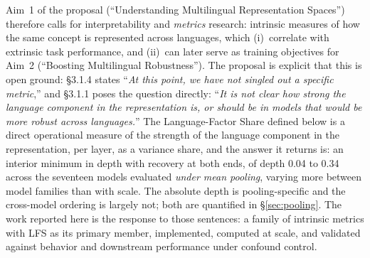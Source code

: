 \documentclass[11pt,a4paper]{article}
\begin{document}
Aim~1 of the proposal (``Understanding Multilingual Representation Spaces'')
therefore calls for interpretability and \emph{metrics} research: intrinsic
measures of how the same concept is represented across languages, which
(i)~correlate with extrinsic task performance, and (ii)~can later serve as
training objectives for Aim~2 (``Boosting Multilingual Robustness''). The
proposal is explicit that this is open ground: \S3.1.4 states ``\emph{At this
point, we have not singled out a specific metric},'' and \S3.1.1 poses the
question directly: ``\emph{It is not clear how strong the language component
in the representation is, or should be in models that would be more robust
across languages.}'' The Language-Factor Share defined below is a direct
operational measure of
the strength of the language component in the representation, per layer, as
a variance share, and the answer it returns is: an interior minimum in
depth with recovery at both ends, of depth 0.04 to 0.34 across the seventeen
models evaluated \emph{under mean pooling}, varying more between model
families than with scale. The absolute depth is pooling-specific and the
cross-model ordering is largely not; both are quantified in
\S\ref{sec:pooling}. The work
reported here is the response to those sentences: a family of intrinsic
metrics with LFS as its primary member, implemented, computed at scale, and
validated against behavior and downstream performance under confound control.
\end{document}
